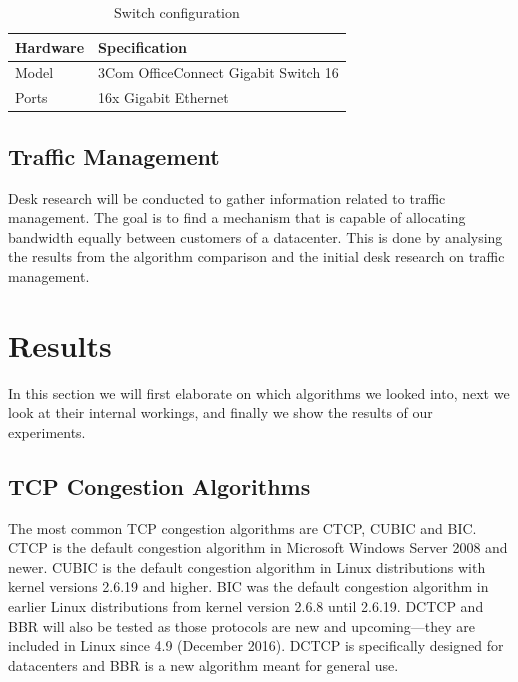 \documentclass{article}
\begin{document}
\begin{table}[H]
	\centering
	\caption{Switch configuration}
	\begin{tabular}[H]{ | l | l | }
	\hline
	\textbf{Hardware} & \textbf{Specification} \\
	\hline  Model & 3Com OfficeConnect Gigabit Switch 16\\
	\hline  Ports & 16x Gigabit Ethernet\\
	\hline
	\end{tabular}
	\label{table:spec2}
\end{table}

\subsection{Traffic Management}

Desk research will be conducted to gather information related to traffic management. The goal is to find a mechanism that is capable of allocating bandwidth equally between customers of a datacenter. This is done by analysing the results from the algorithm comparison and the initial desk research on traffic management.


\section{Results}\label{sec:results}

In this section we will first elaborate on which algorithms we looked into, next we look at their internal workings, and finally we show the results of our experiments.


\subsection{TCP Congestion Algorithms}\label{sub:chosen-algos}

The most common TCP congestion algorithms are CTCP, CUBIC and BIC. CTCP is the default congestion algorithm in Microsoft Windows Server 2008 and newer\cite{cubic-kernel-version}. CUBIC is the default congestion algorithm in Linux distributions with kernel versions 2.6.19 and higher\cite{cubic-kernel-version}. BIC was the default congestion algorithm in earlier Linux distributions from kernel version 2.6.8 until 2.6.19\cite{bic-kernel-version}\cite{cubic-kernel-version}. DCTCP and BBR will also be tested as those protocols are new and upcoming---they are included in Linux since 4.9 (December 2016)\cite{linux-bbr}. DCTCP is specifically designed for datacenters\cite{dctcp-congestion} and BBR is a new algorithm meant for general use\cite{bbr-congestion}.
\end{document}
